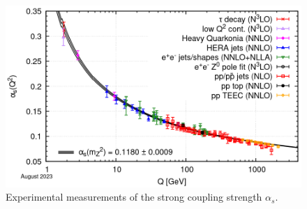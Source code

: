 \begin{figure}[ht]
  \centering
  \includegraphics[width=.65\textwidth]{figures/running-coupling.png}
  \caption{Experimental measurements of the strong coupling strength $\alpha_s$.}
  \label{fig:running-coupling}
\end{figure}
